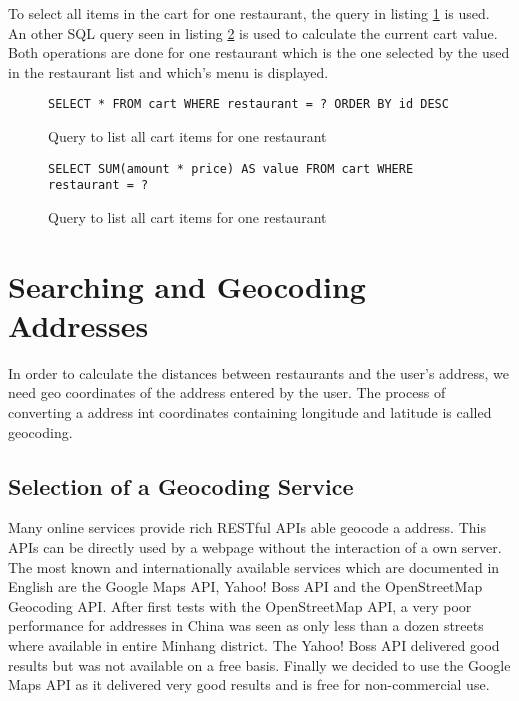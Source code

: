 To select all items in the cart for one restaurant, the query in listing \ref{query_cart} is used. An other SQL query seen in listing \ref{query_cart_value}  is used to calculate the current cart value. Both operations are done for one restaurant which is the one selected by the used in the restaurant list and which's menu is displayed.


\begin{figure}
\lstset{language=sql}
\begin{lstlisting}
SELECT * FROM cart WHERE restaurant = ? ORDER BY id DESC
\end{lstlisting}
\caption{Query to list all cart items for one restaurant}
\label{query_cart}
\end{figure}


\begin{figure}
\lstset{language=sql}
\begin{lstlisting}
SELECT SUM(amount * price) AS value FROM cart WHERE restaurant = ?
\end{lstlisting}
\caption{Query to list all cart items for one restaurant}
\label{query_cart_value}
\end{figure}

\section{Searching and Geocoding Addresses}
In order to calculate the distances between restaurants and the user's address, we need geo coordinates of the address entered by the user. The process of converting a address int coordinates containing longitude and latitude is called geocoding. 

\subsection{Selection of a Geocoding Service}
Many online services provide rich RESTful APIs able geocode a address. This APIs can be directly used by a webpage without the interaction of a own server. The most known and internationally available services which are documented in English are the Google Maps API, Yahoo! Boss API and the OpenStreetMap Geocoding API. After first tests with the OpenStreetMap API, a very poor performance for addresses in China was seen as only less than a dozen streets where available in entire Minhang district. The Yahoo! Boss API delivered good results but was not available on a free basis. Finally we decided to use the Google Maps API as it delivered very good results and is free for non-commercial use. 

